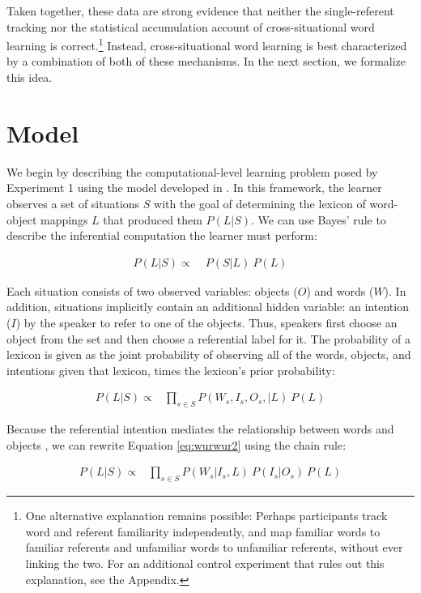 \documentclass[man,floatsintext]{apa6}
\begin{document}
Taken together, these data are strong evidence that neither the single-referent tracking nor the statistical accumulation account of cross-situational word learning is correct.\footnote{One alternative explanation remains possible: Perhaps participants track word and referent familiarity independently, and map familiar words to familiar referents and unfamiliar words to unfamiliar referents, without ever linking the two. For an additional control experiment that rules out this explanation, see the Appendix.} Instead, cross-situational word learning is best characterized by a combination of both of these mechanisms. In the next section, we formalize this idea.

\section{Model}

We begin by describing the computational-level learning problem posed by Experiment 1 using the model developed in . In this framework, the learner observes a set of situations $S$ with the goal of determining the lexicon of word-object mappings $L$ that produced them $P(L|S)$. We can use Bayes' rule to describe the inferential computation the learner must perform: 

\begin{align} 
P(L|S) \propto & \;P(S|L) \: P(L) \label{eq:wurwur1}
\end{align}

\noindent Each situation consists of two observed variables: objects ($O$) and words ($W$). In addition, situations implicitly contain an additional hidden variable: an intention ($I$) by the speaker to refer to one of the objects. Thus, speakers first choose an object from the set and then choose a referential label for it. The probability of a lexicon is given as the joint probability of observing all of the words, objects, and intentions given that lexicon, times the lexicon's prior probability:

\begin{align}
P(L|S) \propto & \prod\limits_{s\in{S}}P(W_{s},I_{s}, O_{s},|L) \: P(L) \label{eq:wurwur2}
\end{align}

\noindent Because the referential intention mediates the relationship between words and objects \cite{Frank2009a}, we can rewrite Equation \ref{eq:wurwur2} using the chain rule:

\begin{align}
P(L|S) \propto & \prod\limits_{s\in{S}}P(W_{s}| I_{s}, L) \: P(I_{s}|O_{s})  \: P(L) \label{eq:wurwur3}
\end{align}
\end{document}
